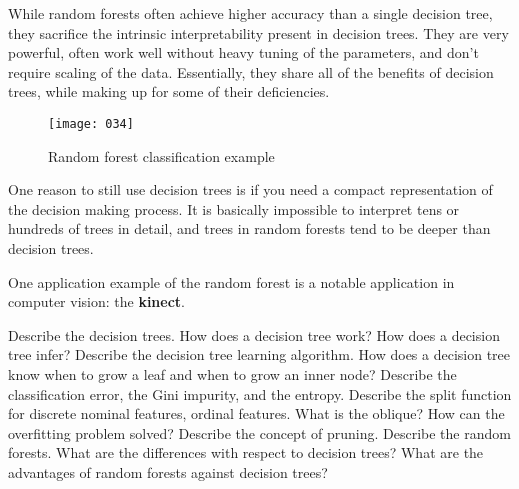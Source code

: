 While random forests often achieve higher accuracy than a single decision tree, they sacrifice the intrinsic interpretability present in decision trees. They are very powerful, often work well without heavy tuning of the parameters, and don't require scaling of the data. Essentially, they share all of the benefits of decision trees, while making up for some of their deficiencies.

\begin{figure}[b!]
\begin{center}
    \texttt{[image: 034]}
\end{center}
\caption{Random forest classification example}
\label{fig:034}
\end{figure}

One reason to still use decision trees is if you need a compact representation of the decision making process. It is basically impossible to interpret tens or hundreds of trees in detail, and trees in random forests tend to be deeper than decision trees.

One application example of the random forest is a notable application in computer vision: the \textbf{kinect}.

\newpage
\begin{exercise}[topsep=20pt,itemsep=10pt]
    \ex Describe the decision trees. How does a decision tree work?
    \ex How does a decision tree infer?
    \ex[!] Describe the decision tree learning algorithm.
    \ex[!] How does a decision tree know when to grow a leaf and when to grow an inner node?
    \ex Describe the classification error, the Gini impurity, and the entropy.
    \ex Describe the split function for discrete nominal features, ordinal features.
    \ex What is the oblique? 
    \ex How can the overfitting problem solved? Describe the concept of pruning.
    \ex Describe the random forests. What are the differences with respect to decision trees?
    \ex[!] What are the advantages of random forests against decision trees?
\end{exercise}
